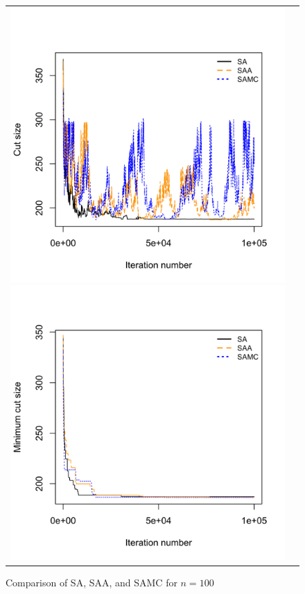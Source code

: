 \documentclass[11pt,]{article}
\begin{document}
\begin{figure}[hbpt]
  \begin{tabular}{cc}
    \includegraphics[width=.5\textwidth]{images/graph_cut_n100_iter1e+05}
    \includegraphics[width=.5\textwidth]{images/graph_min_cut_n100_iter1e+05}
  \end{tabular}
  \caption{Comparison of SA, SAA, and SAMC for $n = 100$}
  \label{fig:n100}
\end{figure}
\end{document}
